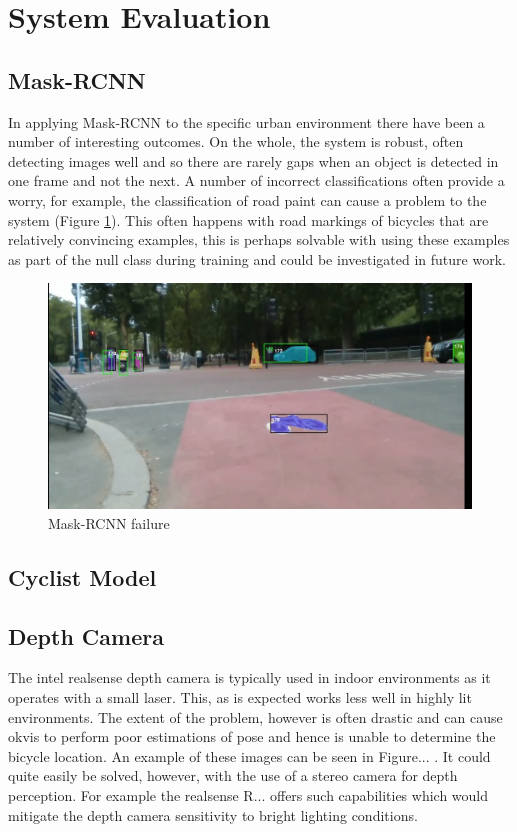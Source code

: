 \documentclass[11pt,twoside]{report}
\begin{document}
\section{System Evaluation}

\subsection{Mask-RCNN}
In applying Mask-RCNN to the specific urban environment there have been a number of interesting outcomes. On the whole, the system is robust, often detecting images well and so there are rarely gaps when an object is detected in one frame and not the next. A number of incorrect classifications often provide a worry, for example, the classification of road paint can cause a problem to the system (Figure \ref{mrcnn_fail}). This often happens with road markings of bicycles that are relatively convincing examples, this is perhaps solvable with using these examples as part of the null class during training and could be investigated in future work.

\noindent \begin{figure}[h!]
	\includegraphics[width = 1.0\hsize]{figures/segment_bike.png}
	\caption{Mask-RCNN failure}
	\label{mrcnn_fail}
\end{figure}



\subsection{Cyclist Model}


\subsection{Depth Camera}

The intel realsense depth camera is typically used in indoor environments as it operates with a small laser. This, as is expected works less well in highly lit environments. The extent of the problem, however is often drastic and can cause okvis to perform poor estimations of pose and hence is unable to determine the bicycle location. An example of these images can be seen in Figure... . It could quite easily be solved, however, with the use of a stereo camera for depth perception. For example the realsense R... offers such capabilities which would mitigate the depth camera sensitivity to bright lighting conditions.
\end{document}
